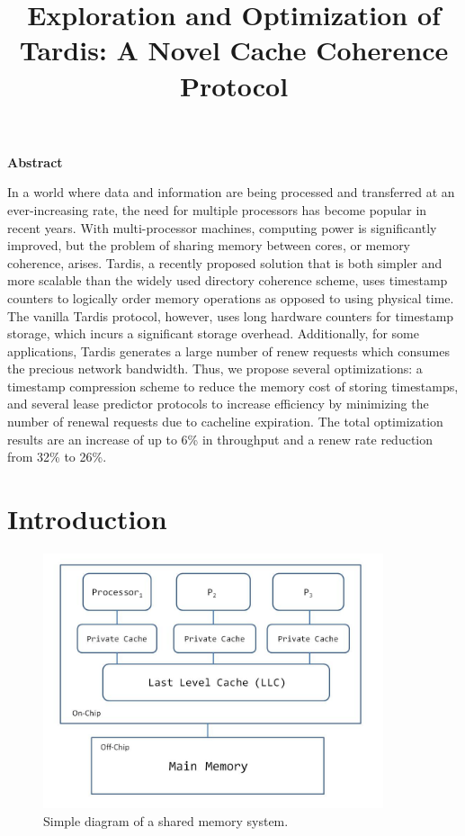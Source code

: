 \documentclass[12pt]{article}
\title{Exploration and Optimization of Tardis: A Novel Cache Coherence Protocol}
\date{}
\begin{document}
	\maketitle
\begin{center}
\textbf{Abstract}
\end{center}

\justify
In a world where data and information are being processed and transferred at an ever-increasing rate, the need for multiple processors has become popular in recent years. With multi-processor machines, computing power is significantly improved, but the problem of sharing memory between cores, or memory coherence, arises. Tardis, a recently proposed solution that is both simpler and more scalable than the widely used directory coherence scheme, uses timestamp counters to logically order memory operations as opposed to using physical time. The vanilla Tardis protocol, however, uses long hardware counters for timestamp storage, which incurs a significant storage overhead. Additionally, for some applications, Tardis generates a large number of renew requests which consumes the precious network bandwidth. Thus, we propose several optimizations: a timestamp compression scheme to reduce the memory cost of storing timestamps, and several lease predictor protocols to increase efficiency by minimizing the number of renewal requests due to cacheline expiration. The total optimization results are an increase of up to 6\% in throughput and a renew rate reduction from 32\% to 26\%.



\section{Introduction}

\begin{figure}
\begin{center}
  \includegraphics[width=10cm]{distributed_system.JPG}
  \caption{Simple diagram of a shared memory system.}
  \label{fig:distributed}
\end{center}
\end{figure}
\end{document}
